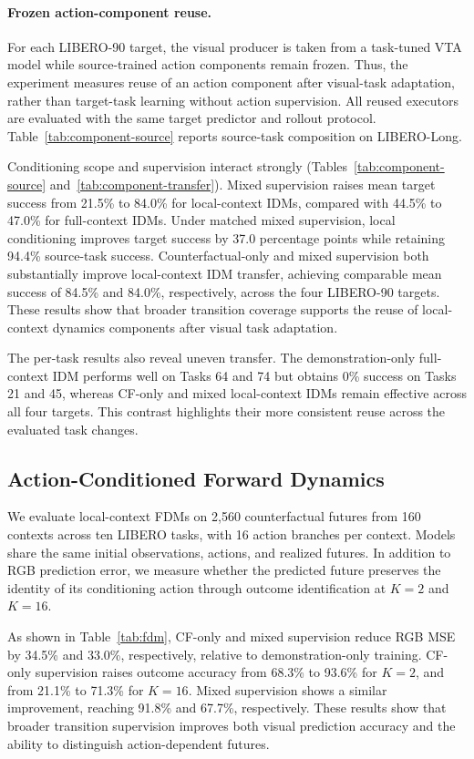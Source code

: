 \paragraph{Frozen action-component reuse.}
For each LIBERO-90 target, the visual producer is taken from a task-tuned
VTA model while source-trained action components remain frozen. Thus, the
experiment measures reuse of an action component after visual-task
adaptation, rather than target-task learning without action supervision.
All reused executors are evaluated with the same target predictor and
rollout protocol. Table~\ref{tab:component-source} reports source-task
composition on LIBERO-Long.

Conditioning scope and supervision interact strongly
(Tables~\ref{tab:component-source} and~\ref{tab:component-transfer}).
Mixed supervision raises mean target success from 21.5\% to 84.0\%
for local-context IDMs, compared with 44.5\% to 47.0\% for
full-context IDMs. Under matched mixed supervision, local conditioning
improves target success by 37.0 percentage points while retaining
94.4\% source-task success.
Counterfactual-only and mixed supervision both substantially improve
local-context IDM transfer, achieving comparable mean success of 84.5\%
and 84.0\%, respectively, across the four LIBERO-90 targets. These
results show that broader transition coverage supports the reuse of
local-context dynamics components after visual task adaptation.

The per-task results also reveal uneven transfer. The demonstration-only
full-context IDM performs well on Tasks 64 and 74 but obtains 0\%
success on Tasks 21 and 45, whereas CF-only and mixed local-context
IDMs remain effective across all four targets. This contrast highlights
their more consistent reuse across the evaluated task changes.

\subsection{Action-Conditioned Forward Dynamics}

We evaluate local-context FDMs on 2,560 counterfactual futures from
160 contexts across ten LIBERO tasks, with 16 action branches per context.
Models share the same initial observations, actions, and realized futures.
In addition to RGB prediction error, we measure whether the predicted future
preserves the identity of its conditioning action through outcome
identification at $K=2$ and $K=16$.

As shown in Table~\ref{tab:fdm}, CF-only and mixed supervision reduce RGB MSE
by 34.5\% and 33.0\%, respectively, relative to demonstration-only training.
CF-only supervision raises outcome accuracy from 68.3\% to 93.6\% for
$K=2$, and from 21.1\% to 71.3\% for $K=16$. Mixed supervision shows a
similar improvement, reaching 91.8\% and 67.7\%, respectively. These results
show that broader transition supervision improves both visual prediction
accuracy and the ability to distinguish action-dependent futures.
